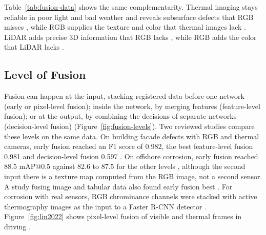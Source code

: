 Table~\ref{tab:fusion-data} shows the same complementarity. Thermal
imaging stays reliable in poor light and bad weather \citep{Lin2022,Jiang2024} and reveals
subsurface defects that RGB misses \citep{Yang2023,Shahsavarani2024}, while RGB supplies the texture and
color that thermal images lack \citep{Liu2025a,Xu2026}. LiDAR adds precise 3D information that
RGB lacks \citep{Zhang2026d}, while RGB adds the color that LiDAR lacks \citep{Gunatilake2021}.

\subsection{Level of Fusion}

Fusion can happen at the input, stacking registered data before one network
(early or pixel-level fusion); inside the network, by merging features
(feature-level fusion); or at the output, by combining the decisions of separate
networks (decision-level fusion) (Figure~\ref{fig:fusion-levels}). Two reviewed
studies compare these levels on the same data. On building facade defects with
RGB and thermal cameras, early fusion reached an F1 score of 0.982, the best
feature-level fusion 0.981 and decision-level fusion 0.597 \citep{Yang2023}. On
offshore corrosion, early fusion reached 88.5 mAP@0.5 against 82.6 to 87.5 for
the other levels \citep{Mao2026}, although the second input there is a texture
map computed from the RGB image, not a second sensor. A study fusing image and
tabular data also found early fusion best \citep{Chowdhury2026}. For corrosion
with real sensors, RGB chrominance channels were stacked with active thermography
images as the input to a Faster R-CNN detector \citep{Lim2021}.
Figure~\ref{fig:lin2022} shows pixel-level fusion of visible and thermal frames
in driving \citep{Lin2022}.

